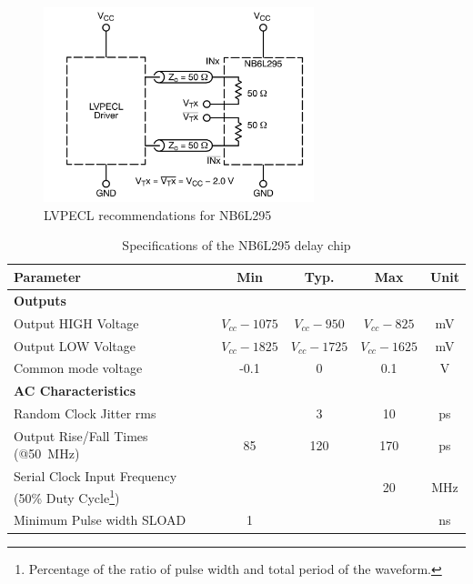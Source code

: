 \begin{figure}[tbh]
	\centering
	\includegraphics[width = 0.7\textwidth]{chap/04-work/img/delay_lvpecl}
	\caption[NB6L295 Delay Chip Schematic]{LVPECL recommendations for NB6L295 \cite{NB6L295}}
	\label{fig:delay_lvpecl}
\end{figure}


\begin{table}[tbh]
	\caption[NB6L295 Characteristics]{Specifications of the NB6L295 delay chip \cite{NB6L295}}
	\label{tab:nb6l295}
	\begin{minipage}{\textwidth}
		\centering
		\begin{tabularx}{\textwidth}{Xcccc}
			\toprule
			\textbf{Parameter} & \textbf{Min} & \textbf{Typ.} & \textbf{Max} & \textbf{Unit}\\
			\midrule
			\textbf{Outputs} &&&& \\
			Output HIGH Voltage & $V_{cc} - 1075$ & $V_{cc} - 950$ & $V_{cc} - 825$ & mV\\
			Output LOW Voltage & $V_{cc} - 1825$ & $V_{cc} - 1725$ & $V_{cc} - 1625$ & mV\\
			Common mode voltage & -0.1 & 0 & 0.1 & V\\[0.3cm]
			\textbf{AC Characteristics} &&&&\\
			Random Clock Jitter \gls{rms}&  & 3 & 10 & ps\\
			Output Rise/Fall Times (@\SI{50}{\mega \hertz}) & 85 & 120 & 170 & ps\\
			Serial Clock Input Frequency (50\% Duty Cycle\footnote{Percentage of the ratio of pulse width and total period of the waveform.}) &  &  & 20 & MHz\\
			Minimum Pulse width SLOAD  & 1 &  &  & ns\\
			\bottomrule
		\end{tabularx}
	\end{minipage}
\end{table}


